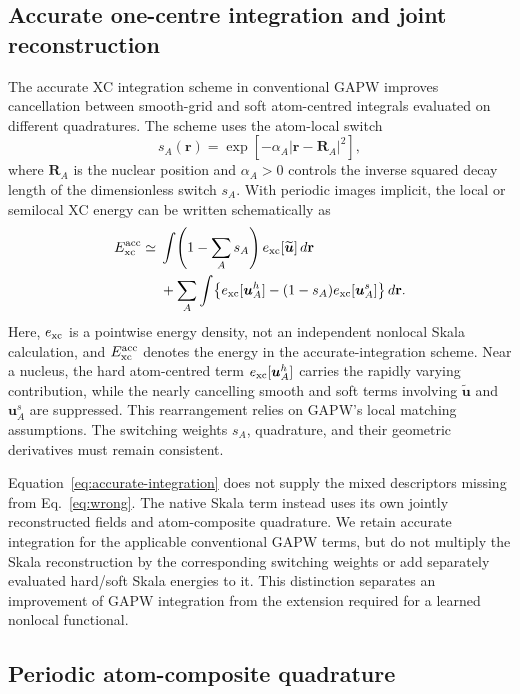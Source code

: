 \documentclass[10pt,a4paper,twocolumn]{article}
\newcommand{\uvec}{\boldsymbol{u}}
\begin{document}
\subsection{Accurate one-centre integration and joint reconstruction}

The accurate XC integration scheme in conventional GAPW improves cancellation between smooth-grid and soft atom-centred integrals evaluated on different quadratures.\cite{CP2K2020} The scheme uses the atom-local switch
\begin{equation}
 s_A(\mathbf r)=\exp[-\alpha_A|\mathbf r-\mathbf R_A|^2],
 \label{eq:xc-switch}
\end{equation}
where $\mathbf R_A$ is the nuclear position and $\alpha_A>0$ controls the inverse squared decay length of the dimensionless switch $s_A$. With periodic images implicit, the local or semilocal XC energy can be written schematically as
\begin{align}
 E_{\rm xc}^{\rm acc}\simeq{}&\int\!\left(1-\sum_A s_A\right)
                         e_{\rm xc}[\widetilde{\uvec}]\,d\mathbf r\nonumber\\
 &+\sum_A\int\!\left\{e_{\rm xc}[\uvec_A^h]
                  -(1-s_A)e_{\rm xc}[\uvec_A^s]\right\}d\mathbf r.
 \label{eq:accurate-integration}
\end{align}
Here, $e_{\rm xc}$ is a pointwise energy density, not an independent nonlocal Skala calculation, and $E_{\rm xc}^{\rm acc}$ denotes the energy in the accurate-integration scheme. Near a nucleus, the hard atom-centred term $e_{\rm xc}[\uvec_A^h]$ carries the rapidly varying contribution, while the nearly cancelling smooth and soft terms involving $\widetilde{\uvec}$ and $\uvec_A^s$ are suppressed. This rearrangement relies on GAPW's local matching assumptions. The switching weights $s_A$, quadrature, and their geometric derivatives must remain consistent.

Equation~\eqref{eq:accurate-integration} does not supply the mixed descriptors missing from Eq.~\eqref{eq:wrong}. The native Skala term instead uses its own jointly reconstructed fields and atom-composite quadrature. We retain accurate integration for the applicable conventional GAPW terms, but do not multiply the Skala reconstruction by the corresponding switching weights or add separately evaluated hard/soft Skala energies to it. This distinction separates an improvement of GAPW integration from the extension required for a learned nonlocal functional.

\subsection{Periodic atom-composite quadrature}
\end{document}
